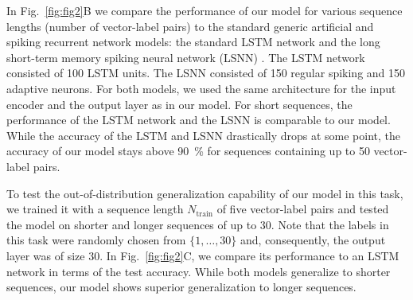 \documentclass{article}
\begin{document}
In Fig.~\ref{fig:fig2}B we compare the performance of our model for various sequence lengths (number of vector-label pairs) to the standard generic artificial and spiking recurrent network models: the standard LSTM network \cite{hochreiter1997long} and the long short-term memory spiking neural network (LSNN) \cite{bellec2018long,salaj2021spike}. The LSTM network consisted of \num{100} LSTM units. The LSNN consisted of \num{150} regular spiking and \num{150} adaptive neurons. For both models, we used the same architecture for the input encoder and the output layer as in our model. For short sequences, the performance of the LSTM network and the LSNN is comparable to our model. While the accuracy of the LSTM and LSNN drastically drops at some point, the accuracy of our model stays above \SI{90}{\percent} for sequences containing up to \num{50} vector-label pairs.

To test the out-of-distribution generalization capability of our model in this task, we trained it with a sequence length $N_\mathrm{train}$ of five vector-label pairs and tested the model on shorter and longer sequences of up to \num{30}. Note that the labels in this task were randomly chosen from $\{1, \dots, 30\}$ and, consequently, the output layer was of size \num{30}. In Fig.~\ref{fig:fig2}C, we compare its performance to an LSTM network in terms of the test accuracy. While both models generalize to shorter sequences, our model shows superior generalization to longer sequences.
\end{document}

